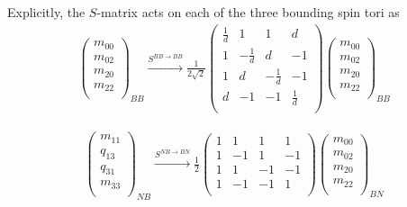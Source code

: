 Explicitly, the $S$-matrix acts on each of the three bounding spin tori as 
\begin{align}
\left( \begin{matrix}
m_{00}\\
m_{02}\\
m_{20}\\
m_{22}\\
\end{matrix} \right)_{BB}
\xrightarrow{S^{BB \rightarrow BB}}
\frac{1}{2 \sqrt{2}} \left( \begin{matrix}
\frac{1}{d}&1&1&d \\
1& -\frac{1}{d} & d &-1 \\
1& d& -\frac{1}{d} & -1 \\
d & -1& -1& \frac{1}{d}\\
\end{matrix} \right)
\left( \begin{matrix}
m_{00}\\
m_{02}\\
m_{20}\\
m_{22}\\
\end{matrix} \right)_{BB}
\end{align}

\begin{align}
\left( \begin{matrix}
m_{11}\\
q_{13}\\
q_{31}\\
m_{33}\\
\end{matrix} \right)_{NB}
\xrightarrow{S^{NB \rightarrow BN}}
\frac{1}{2} \left( \begin{matrix}
1&1&1&1\\
1&-1&1&-1\\
1&1&-1&-1\\
1&-1&-1&1\\
\end{matrix} \right)
\left( \begin{matrix}
m_{00}\\
m_{02}\\
m_{20}\\
m_{22}\\
\end{matrix} \right)_{BN}
\end{align}

